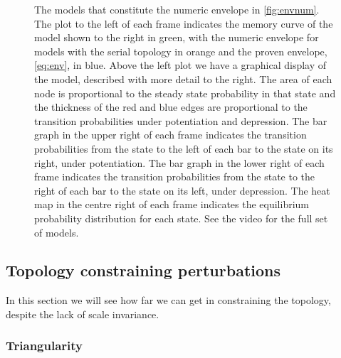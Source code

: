 \documentclass[12pt]{article}
\begin{document}
\begin{figure}[tbp]
\begin{myenuma}
  \end{myenuma}
  \caption[Optimal models]{The models that constitute the numeric envelope in \cref{fig:envnum}.
  The plot to the left of each frame indicates the memory curve of the model shown to the right in green, with the numeric envelope for models with the serial topology in orange and the proven envelope, \eqref{eq:env}, in blue.
  Above the left plot we have a graphical display of the model, described with more detail to the right.
  The area of each node is proportional to the steady state probability in that state and the thickness of the red and blue edges are proportional to the transition probabilities under potentiation and depression.
  The bar graph in the upper right of each frame indicates the transition probabilities from the state to the left of each bar to the state on its right, under potentiation.
  The bar graph in the lower right of each frame indicates the transition probabilities from the state to the right of each bar to the state on its left, under depression.
  The heat map in the centre right of each frame indicates the equilibrium probability distribution for each state.
  See the video for the full set of models.}\label{fig:envvid}
\end{figure}


\subsection{Topology constraining perturbations}\label{sec:topology}

In this section we will see how far we can get in constraining the topology, 
despite the lack of scale invariance.



\subsubsection{Triangularity}\label{sec:parttriangular}
\end{document}
